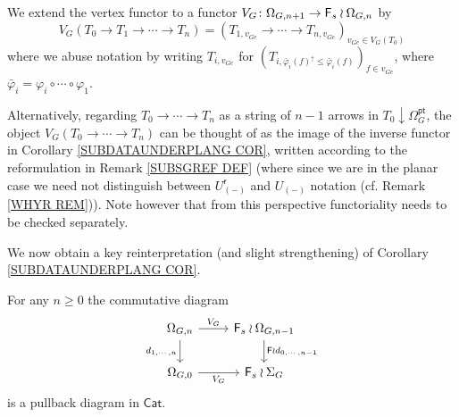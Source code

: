 \documentclass[a4paper,10pt]{article}%
\begin{document}
\begin{notation}\label{VGDEF NOT}
We extend the vertex functor to a functor 
$V_G \colon \Omega_{G,n+1} \to \mathsf{F}_s \wr \Omega_{G,n}$
by
\begin{equation}\label{VGDEF EQ}
	V_G(T_0 \to T_1 \to \cdots \to T_n) = 
	(T_{1,v_{Ge}} \to \cdots \to
	T_{n,v_{Ge}})_{v_{Ge} \in V_G(T_0)}	
\end{equation}
where we abuse notation by writing $T_{i,v_{Ge}}$
for 
$(T_{i,\bar{\varphi}_i(f)^{\uparrow}\leq \bar{\varphi}_i(f)})_{f \in v_{Ge}}$, where 
$\bar{\varphi}_i = \varphi_i \circ \cdots \circ \varphi_1$.

Alternatively, regarding $T_0 \to \cdots \to T_n$ as a string of $n-1$ arrows in $T_0 \downarrow \Omega_G^{\mathsf{pt}}$, 
the object $V_G(T_0 \to \cdots \to T_n)$
can be thought of as the image of the inverse functor in
Corollary \ref{SUBDATAUNDERPLANG COR},
written according to the reformulation in 
Remark \ref{SUBSGREF DEF}
(where since we are in the planar case we need not distinguish between 
$U_{(\minus)}^{\mathsf{r}}$ and $U_{(\minus)}$ notation
(cf. Remark \ref{WHYR REM})).
Note however that from this perspective
functoriality needs to be checked separately.
\end{notation}

We now obtain a key reinterpretation (and slight strengthening) of Corollary \ref{SUBDATAUNDERPLANG COR}.


\begin{proposition} \label{SUBSASPULL PROP}
For any $n\geq 0$ the commutative diagram
	\begin{equation}\label{PTPULL EQ}
	\begin{tikzcd}
		\Omega_{G,n} \ar{r}{V_G} 
		\ar{d}[swap]{d_{1,\cdots,n}} & \Fin_s \wr \Omega_{G,n-1} 
		\ar{d}{\Fin \wr d_{0,\cdots,n-1}}
	\\
		\Omega_{G,0} \ar{r}[swap]{V_G} & \Fin_s \wr \Sigma_G
	\end{tikzcd}
	\end{equation}
is a pullback diagram in $\mathsf{Cat}$.
\end{proposition}
\end{document}
